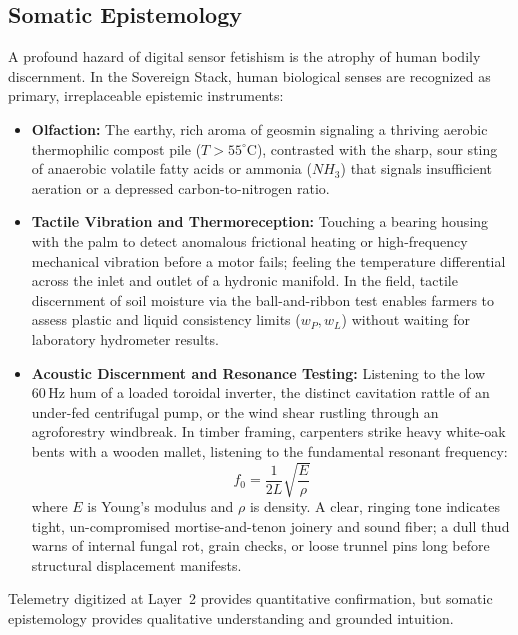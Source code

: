 \subsection{Somatic Epistemology}
A profound hazard of digital sensor fetishism is the atrophy of human bodily discernment. In the Sovereign Stack, human biological senses are recognized as primary, irreplaceable epistemic instruments:
\begin{itemize}
    \item \textbf{Olfaction:} The earthy, rich aroma of geosmin signaling a thriving aerobic thermophilic compost pile ($T > 55^\circ\mathrm{C}$), contrasted with the sharp, sour sting of anaerobic volatile fatty acids or ammonia ($NH_3$) that signals insufficient aeration or a depressed carbon-to-nitrogen ratio.
    \item \textbf{Tactile Vibration and Thermoreception:} Touching a bearing housing with the palm to detect anomalous frictional heating or high-frequency mechanical vibration before a motor fails; feeling the temperature differential across the inlet and outlet of a hydronic manifold. In the field, tactile discernment of soil moisture via the ball-and-ribbon test enables farmers to assess plastic and liquid consistency limits ($w_P, w_L$) without waiting for laboratory hydrometer results.
    \item \textbf{Acoustic Discernment and Resonance Testing:} Listening to the low $60\,\mathrm{Hz}$ hum of a loaded toroidal inverter, the distinct cavitation rattle of an under-fed centrifugal pump, or the wind shear rustling through an agroforestry windbreak. In timber framing, carpenters strike heavy white-oak bents with a wooden mallet, listening to the fundamental resonant frequency:
    \begin{equation}
    f_0 = \frac{1}{2 L} \sqrt{\frac{E}{\rho}}
    \label{eq:timber_acoustic_resonance}
    \end{equation}
    where $E$ is Young's modulus and $\rho$ is density. A clear, ringing tone indicates tight, un-compromised mortise-and-tenon joinery and sound fiber; a dull thud warns of internal fungal rot, grain checks, or loose trunnel pins long before structural displacement manifests.
\end{itemize}
Telemetry digitized at Layer~2 provides quantitative confirmation, but somatic epistemology provides qualitative understanding and grounded intuition.

